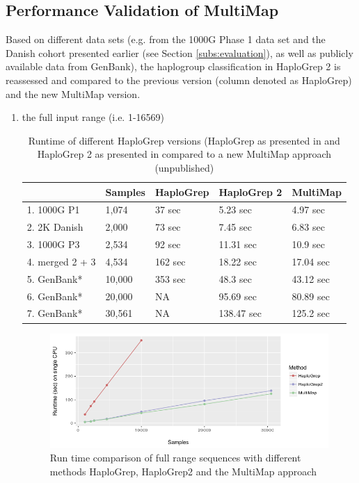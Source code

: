 \subsection{Performance Validation of MultiMap}
Based on different data sets (e.g. from the 1000G Phase 1 data set and the Danish cohort presented earlier (see Section \ref{subs:evaluation}), as well as publicly available data from GenBank), the haplogroup classification in HaploGrep 2 is reassessed and compared to the previous version (column denoted as HaploGrep) and the new MultiMap version. 
\begin{enumerate}[label=(\alph*)]
\item  the full input range (i.e. 1-16569)
\begin{table}[H]
\centering
\caption{Runtime of different HaploGrep versions (HaploGrep as presented in \cite{Kloss-Brandstatter2011} and HaploGrep 2 as presented in \cite{Weissensteiner2016a} compared to a new MultiMap approach (unpublished)}
\label{hg:runtime1}
\begin{tabular}{|l|l|l|l|l|}
\hline
             & Samples & HaploGrep & HaploGrep 2 & MultiMap \\ \hline
1. 1000G P1  & 1,074   & 37 sec  & 5.23 sec       & 4.97  sec        \\ \hline
2. 2K Danish & 2,000   & 73 sec & 7.45  sec      & 6.83  sec       \\ \hline
3. 1000G P3  & 2,534   & 92 sec & 11.31 sec      & 10.9  sec        \\ \hline
4. merged 2 + 3 & 4,534   & 162 sec  & 18.22   sec     & 17.04 sec        \\ \hline
5. GenBank* & 10,000   & 353 sec & 48.3  sec      & 43.12 sec         \\ \hline
6. GenBank*  & 20,000   & NA & 95.69 sec     & 80.89 sec         \\ \hline
7. GenBank*  & 30,561   & NA & 138.47 sec     & 125.2 sec        \\ \hline
\end{tabular}
\end{table}

\begin{figure}[!ht]
    \centering
    \includegraphics[width=1\textwidth]{images/multimap.png}
    \caption[Run time comparison of HaploGrep versions]{Run time comparison of full range sequences with different methods HaploGrep, HaploGrep2 and the MultiMap approach} 
    \label{hg:mutlimap}
\end{figure}


\end{enumerate}
